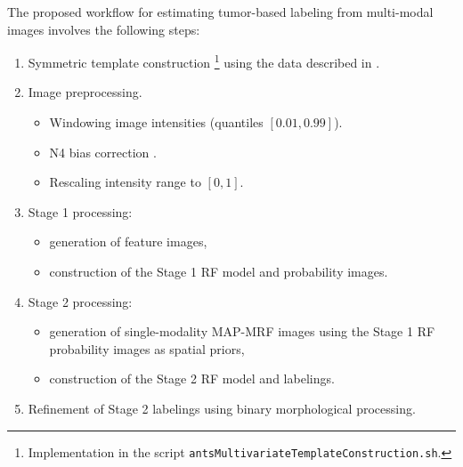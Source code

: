 \documentclass{llncs}
\begin{document}
The proposed workflow for estimating tumor-based labeling from multi-modal images involves the following steps:
\begin{enumerate}
  \item Symmetric template construction \cite{avants2010}%
  \footnote{
  Implementation in the script {\tt antsMultivariateTemplateConstruction.sh}.
  }
 using the data described in \cite{landman2011}.
  \item Image preprocessing.
    \begin{itemize}
      \item Windowing image intensities (quantiles $[0.01,0.99]$).
      \item N4 bias correction \cite{tustison2010}.
      \item Rescaling intensity range to $[0,1]$.  
    \end{itemize}
  \item Stage 1 processing:
  \begin{itemize}
    \item generation of feature images,
    \item construction of the Stage 1 RF model and probability images.
  \end{itemize}
  \item Stage 2 processing:
  \begin{itemize}
    \item generation of single-modality MAP-MRF images using the Stage 1 RF probability images as spatial priors,
    \item construction of the Stage 2 RF model and labelings.
  \end{itemize}
  \item Refinement of Stage 2 labelings using binary morphological processing.
\end{enumerate}

%
\end{document}
